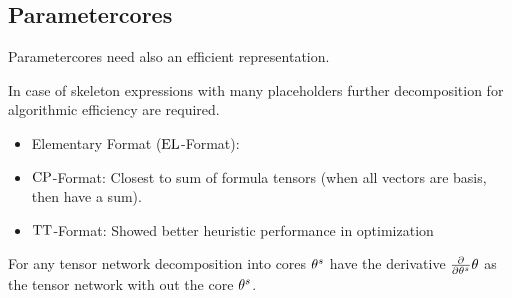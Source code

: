 








\subsection{Parametercores}



Parametercores need also an efficient representation.

In case of skeleton expressions with many placeholders further decomposition for algorithmic efficiency are required.
\begin{itemize}
	\item Elementary Format ($\mathrm{EL}$-Format): 
	\item $\mathrm{CP}$-Format: Closest to sum of formula tensors (when all vectors are basis, then have a sum).
	\item $\mathrm{TT}$-Format: Showed better heuristic performance in optimization
\end{itemize}

For any tensor network decomposition into cores $\theta^{s}$ have the derivative $\frac{\partial}{\partial \theta^{s}} \theta$ as the tensor network with out the core $\theta^{s}$.


